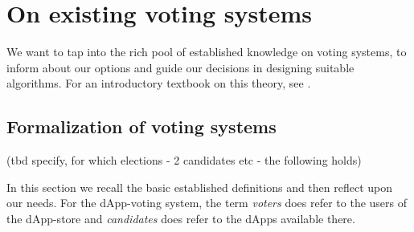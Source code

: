 
\section{On existing voting systems}
We want to tap into the rich pool of established knowledge on voting systems, to inform about our options and guide our decisions in designing suitable algorithms. For an introductory textbook on this theory, see \cite{voting}.

\subsection{Formalization of voting systems}
(tbd specify, for which elections - 2 candidates etc - the following holds)

In this section we recall the basic established definitions and then reflect upon our needs. For the dApp-voting system, the term \textit{voters} does refer to the users of the dApp-store and \textit{candidates} does refer to the dApps available there. \\ 

